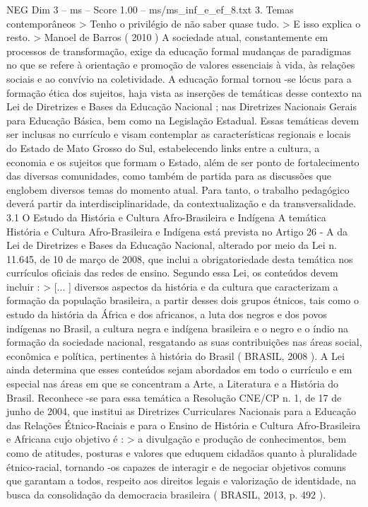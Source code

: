 \begin{textsample}{NEG Dim 3 – ms – Score 1.00 – ms/ms\_inf\_e\_ef\_8.txt}  \label{ex:f3_neg_091}
3.
Temas contemporâneos > Tenho o privilégio de não saber quase tudo. > E isso explica o resto. > Manoel de Barros ( 2010 ) A sociedade atual, constantemente em processos de transformação, exige da educação formal mudanças de paradigmas no que se refere à orientação e promoção de valores essenciais à vida, às relações sociais e ao convívio na coletividade.
A educação formal tornou -se lócus para a formação ética dos sujeitos, haja vista as inserções de temáticas desse contexto na Lei de Diretrizes e Bases da Educação Nacional ; nas Diretrizes Nacionais Gerais para Educação Básica, bem como na Legislação Estadual.
Essas temáticas devem ser inclusas no currículo e visam contemplar as características regionais e locais do Estado de Mato Grosso do Sul, estabelecendo links entre a cultura, a economia e os sujeitos que formam o Estado, além de ser ponto de fortalecimento das diversas comunidades, como também de partida para as discussões que englobem diversos temas do momento atual.
Para tanto, o trabalho pedagógico deverá partir da interdisciplinaridade, da contextualização e da transversalidade. 3.1 O Estudo da História e Cultura Afro-Brasileira e Indígena A temática História e Cultura Afro-Brasileira e Indígena está prevista no Artigo 26 - A da Lei de Diretrizes e Bases da Educação Nacional, alterado por meio da Lei n. 11.645, de 10 de março de 2008, que inclui a obrigatoriedade desta temática nos currículos oficiais das redes de ensino.
Segundo essa Lei, os conteúdos devem incluir : > [... ] diversos aspectos da história e da cultura que caracterizam a formação da população brasileira, a partir desses dois grupos étnicos, tais como o estudo da história da África e dos africanos, a luta dos negros e dos povos indígenas no Brasil, a cultura negra e indígena brasileira e o negro e o índio na formação da sociedade nacional, resgatando as suas contribuições nas áreas social, econômica e política, pertinentes à história do Brasil ( BRASIL, 2008 ).
A Lei ainda determina que esses conteúdos sejam abordados em todo o currículo e em especial nas áreas em que se concentram a Arte, a Literatura e a História do Brasil.
Reconhece -se para essa temática a Resolução CNE/CP n. 1, de 17 de junho de 2004, que institui as Diretrizes Curriculares Nacionais para a Educação das Relações Étnico-Raciais e para o Ensino de História e Cultura Afro-Brasileira e Africana cujo objetivo é : > a divulgação e produção de conhecimentos, bem como de atitudes, posturas e valores que eduquem cidadãos quanto à pluralidade étnico-racial, tornando -os capazes de interagir e de negociar objetivos comuns que garantam a todos, respeito aos direitos legais e valorização de identidade, na busca da consolidação da democracia brasileira ( BRASIL, 2013, p. 492 ).

\end{textsample}
